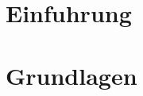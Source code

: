 \documentclass{beamer}
\begin{document}
\begin{frame}
    \tableofcontents
\end{frame}

\part{Einfuhrung}


\part{Grundlagen}

\end{document}
